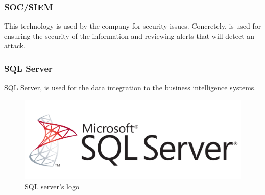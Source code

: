 \documentclass[12pt]{article}
\begin{document}
\subsubsection*{SOC/SIEM}
This technology is used by the company for security issues. Concretely, is used for ensuring the security of the information and reviewing alerts that will detect an attack.\\
\subsubsection*{SQL Server}
SQL Server, is used for the data integration to the business intelligence systems.
\begin{figure}[H]
    \centering
    \includegraphics[scale = 0.3]{Images/sql server.png}
    \caption{SQL server's logo}
    \label{fig:SQL}
\end{figure}
\end{document}
